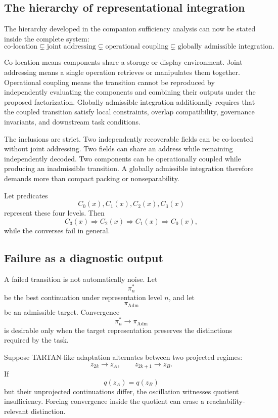 \documentclass[11pt]{article}
\theoremstyle{definition}
\DeclareMathOperator{\Adm}{Adm}
\begin{document}
\subsection{The hierarchy of representational integration}

The hierarchy developed in the companion sufficiency analysis can now be stated inside the complete system:
\[
\text{co-location}
\subsetneq
\text{joint addressing}
\subsetneq
\text{operational coupling}
\subsetneq
\text{globally admissible integration}.
\]

Co-location means components share a storage or display environment. Joint addressing means a single operation retrieves or manipulates them together. Operational coupling means the transition cannot be reproduced by independently evaluating the components and combining their outputs under the proposed factorization. Globally admissible integration additionally requires that the coupled transition satisfy local constraints, overlap compatibility, governance invariants, and downstream task conditions.

The inclusions are strict. Two independently recoverable fields can be co-located without joint addressing. Two fields can share an address while remaining independently decoded. Two components can be operationally coupled while producing an inadmissible transition. A globally admissible integration therefore demands more than compact packing or nonseparability.

Let predicates
\[
C_0(x),C_1(x),C_2(x),C_3(x)
\]
represent these four levels. Then
\[
C_3(x)\Longrightarrow C_2(x)
\Longrightarrow C_1(x)
\Longrightarrow C_0(x),
\]
while the converses fail in general.

\subsection{Failure as a diagnostic output}

A failed transition is not automatically noise. Let
\[
\pi_n^{*}
\]
be the best continuation under representation level \(n\), and let
\[
\pi_{\Adm}
\]
be an admissible target. Convergence
\[
\pi_n^{*}\to\pi_{\Adm}
\]
is desirable only when the target representation preserves the distinctions required by the task.

Suppose TARTAN-like adaptation alternates between two projected regimes:
\[
z_{2k}\to z_A,
\qquad
z_{2k+1}\to z_B.
\]
If
\[
q(z_A)=q(z_B)
\]
but their unprojected continuations differ, the oscillation witnesses quotient insufficiency. Forcing convergence inside the quotient can erase a reachability-relevant distinction.
\end{document}
